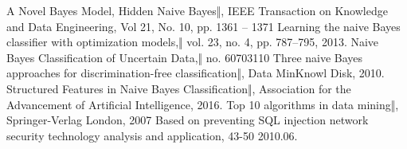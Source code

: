 \documentclass[letterpaper,12pt]{article}
\begin{document}
\begin{thebibliography}{99}

A Novel Bayes Model, Hidden Naive Bayes‖, IEEE Transaction on
Knowledge and Data Engineering, Vol 21, No. 10, pp. 1361 – 1371
Learning the naive Bayes classifier with optimization models,‖ vol. 23, no. 4, pp. 787–795,
2013.
Naive Bayes Classification of Uncertain Data,‖ no.
60703110
Three naive Bayes approaches for discrimination-free classification‖, Data MinKnowl Disk, 2010.
Structured Features in Naive Bayes Classification‖, Association for
the Advancement of Artificial Intelligence, 2016.
Top 10 algorithms in data mining‖, Springer-Verlag London, 2007
Based on preventing SQL injection network security technology analysis and application, 43-50 2010.06.
\end{thebibliography}
\end{document}
